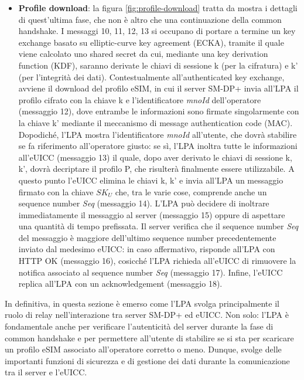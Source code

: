 \documentclass[10pt, twoside, openany]{book}
\begin{document}
\begin{itemize}
\item \textbf{Profile download}: la figura \ref{fig:profile-download} tratta da \cite{Sec-analysis} mostra i dettagli di quest'ultima fase, che non è altro che una continuazione della common handshake. I messaggi 10, 11, 12, 13 si occupano di portare a termine un key exchange basato su elliptic-curve key agreement (ECKA), tramite il quale viene calcolato uno shared secret da cui, mediante una key derivation function (KDF), saranno derivate le chiavi di sessione k (per la cifratura) e k' (per l'integrità dei dati). Contestualmente all'authenticated key exchange, avviene il download del profilo eSIM, in cui il server SM-DP+ invia all'LPA il profilo cifrato con la chiave k e l'identificatore \textit{mnoId} dell'operatore (messaggio 12), dove entrambe le informazioni sono firmate singolarmente con la chiave k' mediante il meccanismo di message authentication code (MAC). Dopodiché, l'LPA mostra l'identificatore \textit{mnoId} all'utente, che dovrà stabilire se fa riferimento all'operatore giusto: se sì, l'LPA inoltra tutte le informazioni all'eUICC (messaggio 13) il quale, dopo aver derivato le chiavi di sessione k, k', dovrà decriptare il profilo P, che risulterà finalmente essere utilizzabile. A questo punto l'eUICC elimina le chiavi k, k' e invia all'LPA un messaggio firmato con la chiave $SK_{U}$ che, tra le varie cose, comprende anche un sequence number \textit{Seq} (messaggio 14). L'LPA può decidere di inoltrare immediatamente il messaggio al server (messaggio 15) oppure di aspettare una quantità di tempo prefissata. Il server verifica che il sequence number \textit{Seq} del messaggio è maggiore dell'ultimo sequence number precedentemente inviato dal medesimo eUICC: in caso affermativo, risponde all'LPA con HTTP OK (messaggio 16), cosicché l'LPA richieda all'eUICC di rimuovere la notifica associato al sequence number \textit{Seq} (messaggio 17). Infine, l'eUICC replica all'LPA con un acknowledgement (messaggio 18).
\end{itemize}
In definitiva, in questa sezione è emerso come l'LPA svolga principalmente il ruolo di relay nell'interazione tra server SM-DP+ ed eUICC. Non solo: l'LPA è fondamentale anche per verificare l'autenticità del server durante la fase di common handshake e per permettere all'utente di stabilire se si sta per scaricare un profilo eSIM associato all'operatore corretto o meno. Dunque, svolge delle importanti funzioni di sicurezza e di gestione dei dati durante la comunicazione tra il server e l'eUICC.
\end{document}

